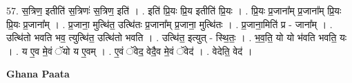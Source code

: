 \documentclass[17pt]{extarticle}
\begin{document}
57. स॒त्रिण॒ इतीति॑ स॒त्रिणः॑ स॒त्रिण॒ इति॑ । . इति॑ प्रि॒यः प्रि॒य इतीति॑ प्रि॒यः । . प्रि॒यः प्र॒जाना᳚म् प्र॒जाना᳚म् प्रि॒यः प्रि॒यः प्र॒जाना᳚म् । . प्र॒जाना॒ मुत्थि॑त॒ उत्थि॑तः प्र॒जाना᳚म् प्र॒जाना॒ मुत्थि॑तः । . प्र॒जाना॒मिति॑ प्र - जाना᳚म् । . उत्थि॑तो भवति भव॒ त्युत्थि॑त॒ उत्थि॑तो भवति । . उत्थि॑त॒ इत्युत् - स्थि॒तः॒ । . भ॒व॒ति॒ यो यो भ॑वति भवति॒ यः । . य ए॒व मे॒वं ॅयो य ए॒वम् । . ए॒वं ॅवेद॒ वेदै॒व मे॒वं ॅवेद॑ । . वेदेति॒ वेद॑ । \newline

\textbf{Ghana Paata } \newline
\end{document}
